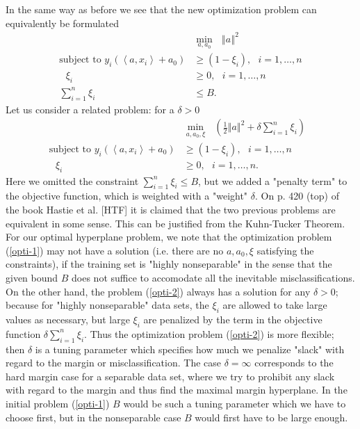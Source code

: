 \documentclass[11pt,twoside]{article}%
\theoremstyle{change}
\begin{document}
In the same way as before we see that the new optimization problem can
equivalently be formulated
\begin{align}
& \min_{a,a_{0}}\text{\ }\left\Vert a\right\Vert ^{2}\text{ }\label{opti-1}\\
\text{subject to }y_{i}\left(  \left\langle a,x_{i}\right\rangle
+a_{0}\right)   & \geq(1-\xi_{i}),\text{\ }i=1,\ldots,n\nonumber\\
\text{ }\xi_{i}  & \geq0,\text{ \ }i=1,\ldots,n\nonumber\\
\sum_{i=1}^{n}\xi_{i}  & \leq B\text{.}\nonumber
\end{align}
Let us consider a related problem: for a $\delta>0$
\begin{align}
& \min_{a,a_{0},\xi}\text{\ }\left(  \frac{1}{2}\left\Vert a\right\Vert
^{2}+\delta\sum_{i=1}^{n}\xi_{i}\right)  \text{ }\label{opti-2}\\
\text{subject to }y_{i}\left(  \left\langle a,x_{i}\right\rangle
+a_{0}\right)   & \geq(1-\xi_{i}),\text{\ }i=1,\ldots,n\nonumber\\
\text{ }\xi_{i}  & \geq0,\text{ \ }i=1,\ldots,n\text{.}\nonumber
\end{align}
Here we omitted the constraint $\sum_{i=1}^{n}\xi_{i}\leq B$, but we added a
"penalty term" to the objective function, which is weighted with a "weight"
$\delta$. On p. 420 (top) of the book Hastie et al. [HTF] it is claimed that
the two previous problems are equivalent in some sense. This can be justified
from the Kuhn-Tucker Theorem. For our optimal hyperplane problem, we note that
the optimization problem (\ref{opti-1}) may not have a solution (i.e. there
are no $a,a_{0},\xi$ satisfying the constraints), if the training set is
"highly nonseparable" in the sense that the given bound $B$ does not suffice
to accomodate all the inevitable misclassifications. On the other hand, the
problem (\ref{opti-2}) always has a solution for any $\delta>0$; because for
"highly nonseparable" data sets, the $\xi_{i}$ are allowed to take large
values as necessary, but large $\xi_{i}$ are penalized by the term in the
objective function $\delta\sum_{i=1}^{n}\xi_{i}$. Thus the optimization
problem (\ref{opti-2}) is more flexible; then $\delta$ is a tuning parameter
which specifies how much we penalize "slack" with regard to the margin or
misclassification. The case $\delta=\infty$ corresponds to the hard margin
case for a separable data set, where we try to prohibit any slack with regard
to the margin and thus find the maximal margin hyperplane. In the initial
problem (\ref{opti-1}) $B$ would be such a tuning parameter which we have to
choose first, but in the nonseparable case $B$ would first have to be large enough.
\end{document}
